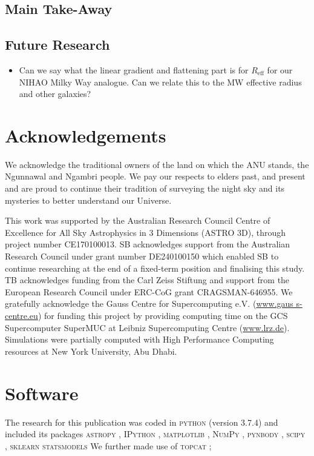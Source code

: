 \documentclass[fleqn,usenatbib]{mnras}
\begin{document}
\subsection{Main Take-Away}

\subsection{Future Research}

\begin{itemize}
    \item Can we say what the linear gradient and flattening part is for $R_\text{eff}$ for our NIHAO Milky Way analogue. Can we relate this to the MW effective radius and other galaxies?
\end{itemize}

\section*{Acknowledgements}

We acknowledge the traditional owners of the land on which the ANU stands, the Ngunnawal and Ngambri people. We pay our respects to elders past, and present and are proud to continue their tradition of surveying the night sky and its mysteries to better understand our Universe.

This work was supported by the Australian Research Council Centre of Excellence for All Sky Astrophysics in 3 Dimensions (ASTRO 3D), through project number CE170100013. SB acknowledges support from the Australian Research Council under grant number DE240100150 which enabled SB to continue researching at the end of a fixed-term position and finalising this study. TB acknowledges funding from the Carl Zeiss Stiftung and support from the European Research Council under ERC-CoG grant CRAGSMAN-646955. We gratefully acknowledge the Gauss Centre for Supercomputing e.V. (\url{www.gaus s-centre.eu}) for funding this project by providing computing time on the GCS Supercomputer SuperMUC at Leibniz Supercomputing Centre (\url{www.lrz.de}). Simulations were partially computed with High Performance Computing resources at New York University, Abu Dhabi.

\section*{Software}

The research for this publication was coded in \textsc{python} (version 3.7.4) and included its packages
\textsc{astropy} \citep[v. 3.2.2;][]{Robitaille2013,PriceWhelan2018},
\textsc{IPython} \citep[v. 7.8.0;][]{ipython},
\textsc{matplotlib} \citep[v. 3.1.3;][]{matplotlib},
\textsc{NumPy} \citep[v. 1.17.2;][]{numpy},
\textsc{pynbody} \citep[v. 1.1.0;][]{pynbody},
\textsc{scipy} \citep[v. 1.3.1;][]{Scipy},
\textsc{sklearn} \citep[v. 1.5.1][]{scikit-learn}
\textsc{statsmodels} \citep[v. 0.14.2][]{statsmodels}
We further made use of \textsc{topcat} \citep[version 4.7;][]{Taylor2005};
\end{document}

